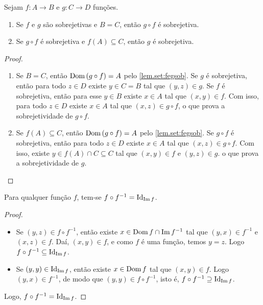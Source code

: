\begin{proposition} \label{prop.set:fegsob}
    Sejam $f : A \to B$ e $g : C \to D$ funções.
        \begin{enumerate}[leftmargin=*, align=left, label=\textbf{(\alph*)}]
            \item Se $f$ e $g$ são sobrejetivas e $B=C$, então $g \circ f$ é sobrejetiva.
            \item Se $g \circ f$ é sobrejetiva e $f(A) \subseteq C$, então $g$ é sobrejetiva.
        \end{enumerate} 
\end{proposition}

\begin{proof}
    \leavevmode
        \begin{enumerate}[leftmargin=*, align=left, label=\textbf{(\alph*)}]
            \item Se $B=C$, então $\operatorname{Dom} \, (g \circ f) = A$ pelo \cref{lem.set:fegsob}. Se $g$ é sobrejetiva, então para todo $z \in D$ existe $y \in C = B$ tal que $(y,z) \in g$. Se $f$ é sobrejetiva, então para esse $y \in B$ existe $x \in A$ tal que $(x,y) \in f$. Com isso, para todo $z \in D$ existe $x \in A$ tal que $(x,z) \in g \circ f$, o que prova a sobrejetividade de $g \circ f$. \blackproof
            \item Se $f(A) \subseteq C$, então $\operatorname{Dom} \, (g \circ f) = A$ pelo \cref{lem.set:fegsob}. Se $g \circ f$ é sobrejetiva, então para todo $z \in D$ existe $x \in A$ tal que $(x,z) \in g \circ f$. Com isso, existe $y \in f(A) \cap C \subseteq C$ tal que $(x,y) \in f$ e $(y,z) \in g$. o que prova a sobrejetividade de $g$. \blackproof
        \end{enumerate}
\end{proof}

\begin{lemma} \label{lema.set:fbolafmenos1}
    Para qualquer função $f$, tem-se $f \circ f^{-1} = \operatorname{Id}_{\operatorname{Im} f}$.
\end{lemma}

\begin{proof}
    \leavevmode
        \begin{itemize}[align=left]
            \item[($\subseteq$)] Se $(y,z) \in f \circ f^{-1}$, então existe $x \in \operatorname{Dom} f \cap \operatorname{Im} f^{-1}$ tal que $(y,x) \in f^{-1}$ e $(x,z) \in f$. Daí, $(x,y) \in f$, e como $f$ é uma função, temos $y=z$. Logo $f \circ f^{-1} \subseteq \operatorname{Id}_{\operatorname{Im} f}$.
            \item[($\supseteq$)] Se $(y,y) \in \operatorname{Id}_{\operatorname{Im} f}$, então existe $x \in \operatorname{Dom} f$ tal que $(x,y) \in f$. Logo $(y,x) \in f^{-1}$, de modo que $(y, y) \in f \circ f^{-1}$, isto é, $f \circ f^{-1} \supseteq \operatorname{Id}_{\operatorname{Im} f}$.
        \end{itemize}
    Logo, $f \circ f^{-1} = \operatorname{Id}_{\operatorname{Im} f}$. \blackproof
\end{proof}


